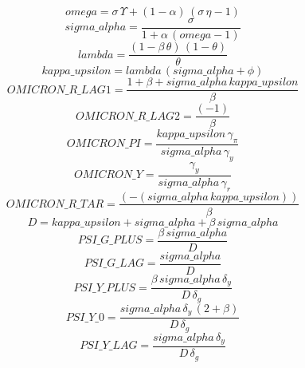 \begin{dmath*}
omega = {\sigma}\, {\Upsilon}+\left(1-{\alpha}\right)\, \left({\sigma}\, {\eta}-1\right)
\end{dmath*}
\begin{dmath*}
sigma\_alpha = \frac{{\sigma}}{1+{\alpha}\, \left({omega}-1\right)}
\end{dmath*}
\begin{dmath*}
lambda = \frac{\left(1-{\beta}\, {\theta}\right)\, \left(1-{\theta}\right)}{{\theta}}
\end{dmath*}
\begin{dmath*}
kappa\_upsilon = {lambda}\, \left({sigma\_alpha}+{\phi}\right)
\end{dmath*}
\begin{dmath*}
OMICRON\_R\_LAG1 = \frac{1+{\beta}+{sigma\_alpha}\, {kappa\_upsilon}}{{\beta}}
\end{dmath*}
\begin{dmath*}
OMICRON\_R\_LAG2 = \frac{\left(-1\right)}{{\beta}}
\end{dmath*}
\begin{dmath*}
OMICRON\_PI = \frac{{kappa\_upsilon}\, {\gamma_{\pi}}}{{sigma\_alpha}\, {\gamma_{y}}}
\end{dmath*}
\begin{dmath*}
OMICRON\_Y = \frac{{\gamma_{y}}}{{sigma\_alpha}\, {\gamma_{r}}}
\end{dmath*}
\begin{dmath*}
OMICRON\_R\_TAR = \frac{\left(-\left({sigma\_alpha}\, {kappa\_upsilon}\right)\right)}{{\beta}}
\end{dmath*}
\begin{dmath*}
D = {kappa\_upsilon}+{sigma\_alpha}+{\beta}\, {sigma\_alpha}
\end{dmath*}
\begin{dmath*}
PSI\_G\_PLUS = \frac{{\beta}\, {sigma\_alpha}}{{D}}
\end{dmath*}
\begin{dmath*}
PSI\_G\_LAG = \frac{{sigma\_alpha}}{{D}}
\end{dmath*}
\begin{dmath*}
PSI\_Y\_PLUS = \frac{{\beta}\, {sigma\_alpha}\, {\delta_{y}}}{{D}\, {\delta_{g}}}
\end{dmath*}
\begin{dmath*}
PSI\_Y\_0 = \frac{{sigma\_alpha}\, {\delta_{y}}\, \left(2+{\beta}\right)}{{D}\, {\delta_{g}}}
\end{dmath*}
\begin{dmath*}
PSI\_Y\_LAG = \frac{{sigma\_alpha}\, {\delta_{y}}}{{D}\, {\delta_{g}}}
\end{dmath*}
